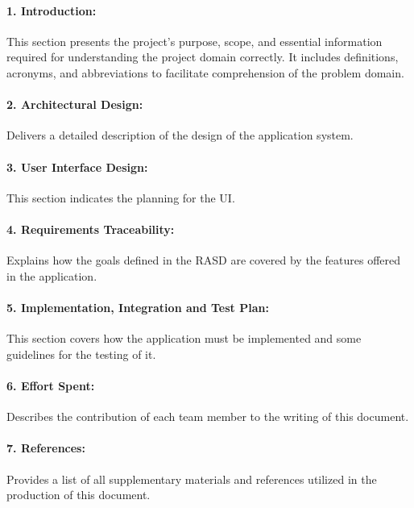 \paragraph{1. Introduction:} This section presents the project's purpose, scope, and essential information required for understanding the project domain correctly. It includes definitions, acronyms, and abbreviations to facilitate comprehension of the problem domain.

\paragraph{2. Architectural Design:} Delivers a detailed description of the design of the application system.

\paragraph{3. User Interface Design:}  This section indicates the planning for the UI.

\paragraph{4. Requirements Traceability:} Explains how the goals defined in the RASD are covered by the features offered in the application.

\paragraph{5. Implementation, Integration and Test Plan:} This section covers how the application must be implemented and some guidelines for the testing of it.

\paragraph{6. Effort Spent:} Describes the contribution of each team member to the writing of this document.

\paragraph{7. References:} Provides a list of all supplementary materials and references utilized in the production of this document.

